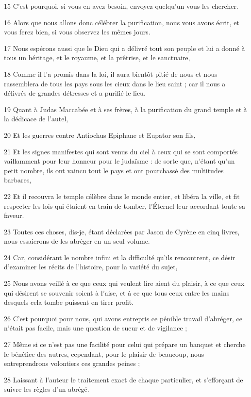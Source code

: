 \par 15 C'est pourquoi, si vous en avez besoin, envoyez quelqu'un vous les chercher.
\par 16 Alors que nous allons donc célébrer la purification, nous vous avons écrit, et vous ferez bien, si vous observez les mêmes jours.
\par 17 Nous espérons aussi que le Dieu qui a délivré tout son peuple et lui a donné à tous un héritage, et le royaume, et la prêtrise, et le sanctuaire,
\par 18 Comme il l'a promis dans la loi, il aura bientôt pitié de nous et nous rassemblera de tous les pays sous les cieux dans le lieu saint ; car il nous a délivrés de grandes détresses et a purifié le lieu.
\par 19 Quant à Judas Maccabée et à ses frères, à la purification du grand temple et à la dédicace de l'autel,
\par 20 Et les guerres contre Antiochus Epiphane et Eupator son fils,
\par 21 Et les signes manifestes qui sont venus du ciel à ceux qui se sont comportés vaillamment pour leur honneur pour le judaïsme : de sorte que, n'étant qu'un petit nombre, ils ont vaincu tout le pays et ont pourchassé des multitudes barbares,
\par 22 Et il recouvra le temple célèbre dans le monde entier, et libéra la ville, et fit respecter les lois qui étaient en train de tomber, l'Éternel leur accordant toute sa faveur.
\par 23 Toutes ces choses, dis-je, étant déclarées par Jason de Cyrène en cinq livres, nous essaierons de les abréger en un seul volume.
\par 24 Car, considérant le nombre infini et la difficulté qu'ils rencontrent, ce désir d'examiner les récits de l'histoire, pour la variété du sujet,
\par 25 Nous avons veillé à ce que ceux qui veulent lire aient du plaisir, à ce que ceux qui désirent se souvenir soient à l'aise, et à ce que tous ceux entre les mains desquels cela tombe puissent en tirer profit.
\par 26 C'est pourquoi pour nous, qui avons entrepris ce pénible travail d'abréger, ce n'était pas facile, mais une question de sueur et de vigilance ;
\par 27 Même si ce n'est pas une facilité pour celui qui prépare un banquet et cherche le bénéfice des autres, cependant, pour le plaisir de beaucoup, nous entreprendrons volontiers ces grandes peines ;
\par 28 Laissant à l'auteur le traitement exact de chaque particulier, et s'efforçant de suivre les règles d'un abrégé.
